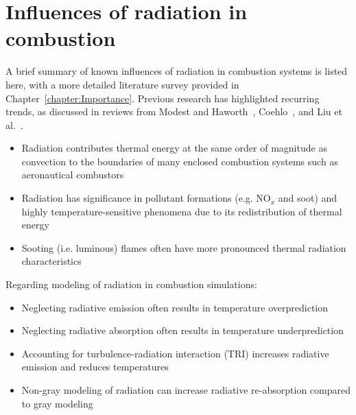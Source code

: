 \section{Influences of radiation in combustion}
A brief summary of known influences of radiation in combustion systems is listed here, with a more detailed literature survey provided in Chapter~\ref{chapter:Importance}.
Previous research has highlighted recurring trends, as discussed in reviews from Modest and Haworth~\cite{Modest2016RadiativeSystems}, Coehlo~\cite{Coelho2018RadiativeSystems}, and Liu et al.~\cite{Liu2020TheFlames}. 
\begin{itemize}
    \item Radiation contributes thermal energy at the same order of magnitude as convection to the boundaries of many enclosed combustion systems such as aeronautical combustors~\cite{Berger2016OnLoads,Johnson2021AnalysisMethod}
    \item Radiation has significance in pollutant formations (e.g. NO${}_x$ and soot) and highly temperature-sensitive phenomena due to its redistribution of thermal energy~\cite{Ihme2008ModelingFormulation,Habibi2007TurbulenceFlames,Ren2017MonteChamber}
    \item Sooting (i.e. luminous) flames often have more pronounced thermal radiation characteristics~\cite{Modest2016RadiativeSystems}
\end{itemize}
Regarding modeling of radiation in combustion simulations:
\begin{itemize}
    \item Neglecting radiative emission often results in temperature overprediction~\cite{Gamil2020AssessmentChamber}
    \item Neglecting radiative absorption often results in temperature underprediction~\cite{Ren2017MonteChamber}
    \item Accounting for turbulence-radiation interaction (TRI) increases radiative emission and reduces temperatures~\cite{Coelho2018RadiativeSystems}
    \item Non-gray modeling of radiation can increase radiative re-absorption compared to gray modeling~\cite{Wu2021LimitationsFires}
\end{itemize}



